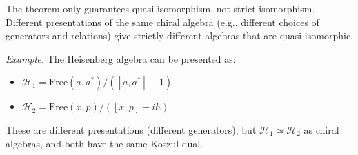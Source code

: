 \begin{remark}\label{rem:non-uniqueness-strict}
The theorem only guarantees quasi-isomorphism, not strict isomorphism. Different 
presentations of the same chiral algebra (e.g., different choices of generators 
and relations) give strictly different algebras that are quasi-isomorphic.

\emph{Example.} The Heisenberg algebra can be presented as:
\begin{itemize}
\item $\mathcal{H}_1 = \text{Free}(a, a^*) / ([a, a^*] - 1)$
\item $\mathcal{H}_2 = \text{Free}(x, p) / ([x, p] - i\hbar)$
\end{itemize}

These are different presentations (different generators), but $\mathcal{H}_1 \simeq \mathcal{H}_2$ 
as chiral algebras, and both have the same Koszul dual.
\end{remark}
